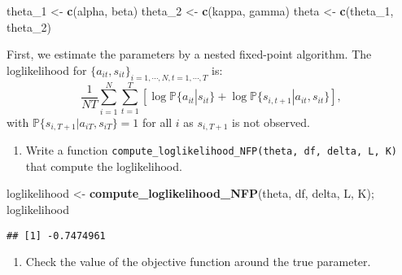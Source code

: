 \documentclass[
]{book}
\newenvironment{Shaded}{\begin{snugshade}}{\end{snugshade}}
\newcommand{\DecValTok}[1]{\textcolor[rgb]{0.00,0.00,0.81}{#1}}
\newcommand{\KeywordTok}[1]{\textcolor[rgb]{0.13,0.29,0.53}{\textbf{#1}}}
\newcommand{\NormalTok}[1]{#1}
\newcommand{\StringTok}[1]{\textcolor[rgb]{0.31,0.60,0.02}{#1}}
\providecommand{\tightlist}{%
  \setlength{\itemsep}{0pt}\setlength{\parskip}{0pt}}
\begin{document}
\begin{Shaded}
\begin{Highlighting}[]
\NormalTok{theta_}\DecValTok{1}\NormalTok{ <-}\StringTok{ }\KeywordTok{c}\NormalTok{(alpha, beta)}
\NormalTok{theta_}\DecValTok{2}\NormalTok{ <-}\StringTok{ }\KeywordTok{c}\NormalTok{(kappa, gamma)}
\NormalTok{theta <-}\StringTok{ }\KeywordTok{c}\NormalTok{(theta_}\DecValTok{1}\NormalTok{, theta_}\DecValTok{2}\NormalTok{)}
\end{Highlighting}
\end{Shaded}

First, we estimate the parameters by a nested fixed-point algorithm. The loglikelihood for \(\{a_{it}, s_{it}\}_{i = 1, \cdots, N, t = 1, \cdots, T}\) is:
\[
\frac{1}{NT} \sum_{i = 1}^N \sum_{t = 1}^T[\log\mathbb{P}\{a_{it}|s_{it}\} + \log \mathbb{P}\{s_{i, t + 1}|a_{it}, s_{it}\}],
\]
with \(\mathbb{P}\{s_{i, T + 1}|a_{iT}, s_{iT}\} = 1\) for all \(i\) as \(s_{i, T + 1}\) is not observed.

\begin{enumerate}
\def\labelenumi{\arabic{enumi}.}
\setcounter{enumi}{1}
\tightlist
\item
  Write a function \texttt{compute\_loglikelihood\_NFP(theta,\ df,\ delta,\ L,\ K)} that compute the loglikelihood.
\end{enumerate}

\begin{Shaded}
\begin{Highlighting}[]
\NormalTok{loglikelihood <-}\StringTok{ }\KeywordTok{compute_loglikelihood_NFP}\NormalTok{(theta, df, delta, L, K); loglikelihood}
\end{Highlighting}
\end{Shaded}

\begin{verbatim}
## [1] -0.7474961
\end{verbatim}

\begin{enumerate}
\def\labelenumi{\arabic{enumi}.}
\setcounter{enumi}{2}
\tightlist
\item
  Check the value of the objective function around the true parameter.
\end{enumerate}
\end{document}
